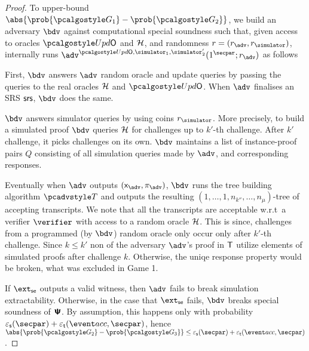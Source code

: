 \begin{proof}
 	To upper-bound $\abs{\prob{\game{1}} - \prob{\game{2}}}$, we build an adversary $\bdv$ against computational special soundness such that, given access to oracles $\initU$ and $\mathcal{H}$, and randomness $r = (r_\adv, \rsim)$, internally runs $\advse^{\initU, \simulator_1, \simulator_2'} (1^\secpar; r_\adv)$ as follows%
		\item
		First, $\bdv$ answers $\adv$ random oracle and update queries by passing the queries to the real
		oracles $\mathcal{H}$ and $\initU$. When $\adv$ finalises an SRS $\mathsf{srs}$, $\bdv$ does the same.
		
		$\bdv$ answers simulator queries by using coins $\rsim$. More precisely, to build a simulated proof $\bdv$ queries $\mathcal{H}$ for challenges up to $k'$-th challenge. After $k'$ challenge, it picks challenges on its own. $\bdv$ maintains a
		list of instance-proof pairs $Q$ consisting of all simulation queries made by
		$\adv$, and corresponding responses.
		
		Eventually when $\adv$ outputs $(\inp_\advse, \zkproof_\advse)$, $\bdv$ runs the tree building algorithm $\tdv$ and outputs the resulting $(1, \ldots, 1, n_{k''}, \ldots, n_\mu)$-tree of accepting transcripts. We note that all the transcripts are acceptable w.r.t~a verifier $\verifier$ with access to a random oracle $\mathcal{H}$. This is since, challenges from a programmed (by $\bdv$) random oracle only occur only after $k'$-th challenge. Since $k \leq k'$ non of the adversary $\adv$'s proof in $\mathsf{T}$ utilize elements of simulated proofs after challenge $k$. Otherwise, the uniqe response property would be broken, what was excluded in Game 1.
	
	If $\extse$ outputs a valid witness, then $\adv$ fails to break simulation extractability. Otherwise, in the case that $\extse$ fails, $\bdv$ breaks special soundness of $\bm{\mathsf{\Psi}}$. By assumption, this happens only with probability $\epss(\secpar) + \epst(\accProb, \secpar)$, hence $\abs{\prob{\game{2}} - \prob{\game{3}}} \leq \epss(\secpar) + \epst(\accProb, \secpar)$.
	

\end{proof}
